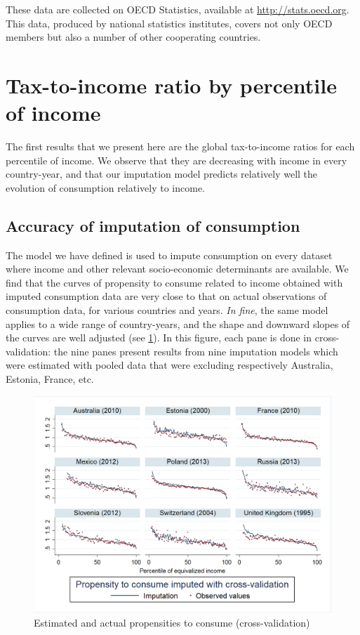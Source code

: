 \documentclass[12pt]{article}
\begin{document}
These data are collected on OECD Statistics, available at \url{http://stats.oecd.org}. This data, produced by national statistics institutes, covers not only OECD members but also a number of other cooperating countries.

\section{Tax-to-income ratio by percentile of income}

The first results that we present here are the global tax-to-income ratios for each percentile of income. We observe that they are decreasing with income in every country-year, and that our imputation model predicts relatively well the evolution of consumption relatively to income.

\subsection{Accuracy of imputation of consumption}
 The model we have defined is used to impute consumption on every dataset where income and other relevant socio-economic determinants are available. We find that the curves of propensity to consume related to income obtained with imputed consumption data are very close to that on actual observations of consumption data, for various countries and years. \textit{In fine}, the same model applies to a wide range of country-years, and the shape and downward slopes of the curves are well adjusted (see \cref{fig:estimated_propensities}). In this figure, each pane is done in cross-validation: the nine panes present results from nine imputation models which were estimated with pooled data that were excluding respectively Australia, Estonia, France, etc. 

\begin{figure}[hp]
\centering
\includegraphics[height=0.42\textheight]{"images/18-11-19 cross-validation"}
\caption{Estimated and actual propensities to consume (cross-validation)}
\label{fig:estimated_propensities}  
\end{figure}
\end{document}
